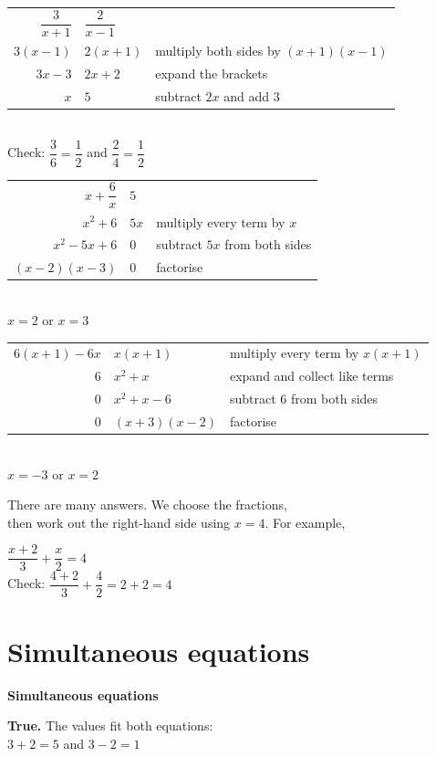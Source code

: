 \documentclass[aspectratio=169]{beamer}
\makeatletter
\newcommand{\qtopic}[1]{%
  \section{#1}%
  \begin{frame}
    \vfill
    \begin{center}
      {\usebeamercolor[fg]{structure}\Huge\bfseries #1}
    \end{center}
    \vfill
  \end{frame}%
}
\newcommand{\steps}[1]{%
  \begin{tabular}{@{}r@{${}={}$}l@{\qquad}l@{}}#1\end{tabular}%
}
\newcommand{\by}[1]{{\normalsize #1}}
\makeatother
\begin{document}
  {\steps{$\dfrac{3}{x+1}$ & $\dfrac{2}{x-1}$ & \\[0.95em]
          $3(x-1)$ & $2(x+1)$ & \by{multiply both sides by $(x+1)(x-1)$}\\
          $3x-3$ & $2x+2$ & \by{expand the brackets}\\
          $x$ & $5$ & \by{subtract $2x$ and add $3$}}\\[0.4em]
   Check: $\dfrac{3}{6}=\dfrac{1}{2}$ and $\dfrac{2}{4}=\dfrac{1}{2}$}

  {\steps{$x+\dfrac{6}{x}$ & $5$ & \\[0.95em]
          $x^{2}+6$ & $5x$ & \by{multiply every term by $x$}\\
          $x^{2}-5x+6$ & $0$ & \by{subtract $5x$ from both sides}\\
          $(x-2)(x-3)$ & $0$ & \by{factorise}}\\[0.4em]
   $x=2$ or $x=3$}

  {\steps{$6(x+1)-6x$ & $x(x+1)$ & \by{multiply every term by $x(x+1)$}\\
          $6$ & $x^{2}+x$ & \by{expand and collect like terms}\\
          $0$ & $x^{2}+x-6$ & \by{subtract $6$ from both sides}\\
          $0$ & $(x+3)(x-2)$ & \by{factorise}}\\[0.4em]
   $x=-3$ or $x=2$}

  {There are many answers. We choose the fractions,\\
   then work out the right-hand side using $x=4$. For example,
   \par\vspace{0.4em}
   $\dfrac{x+2}{3}+\dfrac{x}{2}=4$\\[0.5em]
   Check: $\dfrac{4+2}{3}+\dfrac{4}{2}=2+2=4$}

\qtopic{Simultaneous equations}

  {\textbf{True.} The values fit both equations:\\[0.3em]
   $3+2=5$ and $3-2=1$}
\end{document}
